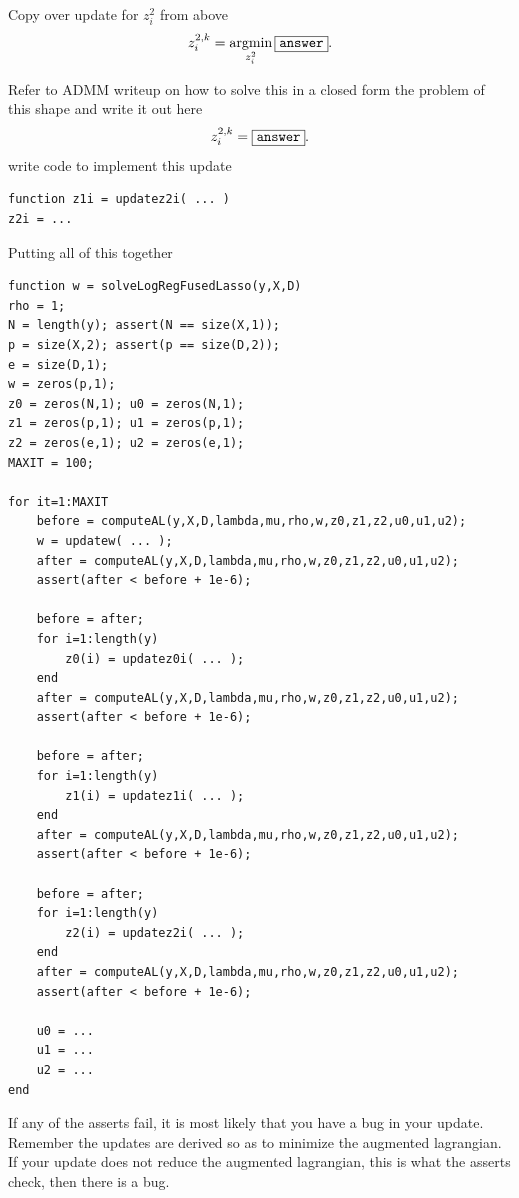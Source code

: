 \documentclass{article}
\begin{document}
{\newproblem{1pt} Copy over update for $z_i^2$ from above
\[
z_i^{2,k} = \mathop{\rm argmin}_{z_i^2}   \fbox{\tt answer}.
\]

Refer to ADMM writeup on how to solve this in a closed form the problem of this shape and write it out here
\[
z_i^{2,k} = \fbox{\tt answer}.
\]
write code to implement this update
\begin{verbatim}
function z1i = updatez2i( ... )
z2i = ...
\end{verbatim}
\newproblem{2pt} Putting all of this together
\begin{verbatim}
function w = solveLogRegFusedLasso(y,X,D)
rho = 1;
N = length(y); assert(N == size(X,1));
p = size(X,2); assert(p == size(D,2));
e = size(D,1);
w = zeros(p,1);
z0 = zeros(N,1); u0 = zeros(N,1);
z1 = zeros(p,1); u1 = zeros(p,1);
z2 = zeros(e,1); u2 = zeros(e,1);
MAXIT = 100;

for it=1:MAXIT
    before = computeAL(y,X,D,lambda,mu,rho,w,z0,z1,z2,u0,u1,u2);
    w = updatew( ... );
    after = computeAL(y,X,D,lambda,mu,rho,w,z0,z1,z2,u0,u1,u2);
    assert(after < before + 1e-6);

    before = after;
    for i=1:length(y)
        z0(i) = updatez0i( ... );
    end
    after = computeAL(y,X,D,lambda,mu,rho,w,z0,z1,z2,u0,u1,u2);
    assert(after < before + 1e-6);

    before = after;
    for i=1:length(y)
        z1(i) = updatez1i( ... );
    end
    after = computeAL(y,X,D,lambda,mu,rho,w,z0,z1,z2,u0,u1,u2);
    assert(after < before + 1e-6);

    before = after;
    for i=1:length(y)
        z2(i) = updatez2i( ... );
    end
    after = computeAL(y,X,D,lambda,mu,rho,w,z0,z1,z2,u0,u1,u2);
    assert(after < before + 1e-6);

    u0 = ...
    u1 = ...
    u2 = ...
end
\end{verbatim}
If any of the asserts fail, it is most likely that you have a bug in your update. Remember the updates are derived so as to minimize the augmented lagrangian. If your update does not reduce the augmented lagrangian, this is what the asserts check, then there is a bug.

}
\end{document}
